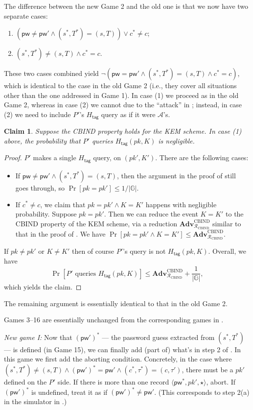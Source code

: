 \documentclass{article}
\theoremstyle{plain}
\newtheorem{claim}{Claim}
\theoremstyle{definition}
\theoremstyle{remark}
\newcommand{\group}{\mathbb{G}}
\newcommand{\adv}{\mathcal{A}}
\newcommand{\red}{\mathcal{R}}
\newcommand{\Adv}{\mathbf{Adv}}
\newcommand{\Htag}{H_\mathsf{tag}}
\newcommand{\pw}{\mathsf{pw}}
\begin{document}
The difference between the new Game 2 and the old one is that we now have two separate cases:
\begin{enumerate}
  \item $(\pw \neq \pw' \land (s^*,T^*) = (s,T)) \lor c^* \neq c$;
  \item $(s^*,T^*) \neq (s,T) \land c^* = c$.
\end{enumerate}
These two cases combined yield $\neg(\pw = \pw' \land (s^*,T^*) = (s,T) \land c^* = c)$, which is identical to the case in the old Game 2 (i.e., they cover all situations other than the one addressed in Game 1). In case (1) we proceed as in the old Game 2, whereas in case (2) we cannot due to the ``attack'' in ; instead, in case (2) we need to include $P'$'s $\Htag$ query as if it were $\adv$'s.
\begin{claim}
\label{clm:htag7}
Suppose the CBIND property holds for the KEM scheme. In case (1) above, the probability that $P'$ queries $\Htag(pk,K)$ is negligible.
\end{claim}
\begin{proof}
$P'$ makes a single $\Htag$ query, on $(pk',K')$. There are the following cases:
\begin{itemize}
  \item If $\pw \neq \pw' \land (s^*,T^*) = (s,T)$, then the argument in the proof of  still goes through, so $\Pr[pk = pk'] \leq 1/|\group|$.
  \item If $c^* \neq c$, we claim that $pk = pk' \land K = K'$ happens with negligible probability. Suppose $pk = pk'$. Then we can reduce the event $K = K'$ to the CBIND property of the KEM scheme, via a reduction $\Adv_{\red_\text{CBIND}}^\text{CBIND}$ similar to that in the proof of . We have $\Pr[pk = pk' \land K = K'] \leq \Adv_{\red_\text{CBIND}}^\text{CBIND}$.
\end{itemize}

If $pk \neq pk'$ or $K \neq K'$ then of course $P'$'s query is not $\Htag(pk,K)$. Overall, we have
\[
\Pr[P'\text{ queries }\Htag(pk,K)] \leq \Adv_{\red_\text{CBIND}}^\text{CBIND} + \frac{1}{|\group|},
\]
which yields the claim.
\end{proof}
The remaining argument is essentially identical to that in the old Game 2.

\medskip
Games 3--16 are essentially unchanged from the corresponding games in .

\medskip\noindent\emph{New game I:} Now that $(\pw')^*$ --- the password guess extracted from $(s^*,T^*)$ --- is defined (in Game 15), we can finally add (part of) what's in step 2 of . In this game we first add the aborting condition. Concretely, in the case where $(s^*,T^*) \neq (s,T) \land (\pw')^* = \pw' \land (c^*,\tau^*) = (c,\tau')$, there must be a $pk'$ defined on the $P'$ side. If there is more than one record $\langle\pw^*,pk',\star\rangle$, abort. If $(\pw')^*$ is undefined, treat it as if $(\pw')^* \neq \pw'$. (This corresponds to step 2(a) in the simulator in .)
\end{document}

